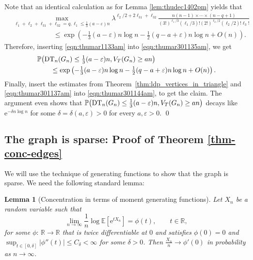 \documentclass[bj,authoryear,noshowframe]{imsart}
\numberwithin{equation}{section}
\theoremstyle{plain}
\newtheorem{lem}[thm]{Lemma}
\theoremstyle{definition}
\newcommand{\vep}{\varepsilon}
\newcommand{\e}{{\mathrm e}}
\newcommand{\DT}{{\rm DT}}
\begin{document}
Note that an identical calculation as for Lemma \ref{lem:thudec1402pm} yields that 
	\begin{equation}
	\label{eqn:thumar1133am}
	\begin{aligned}
	&\max_{\ell_1+\ell_2+\ell_{31}+\ell_{32}=q, \ell_1 \leq \tfrac13(a-\varepsilon)n} 
	{\lambda}^{\ell_2/2 +2\ell_{31}+\ell_{32}}\frac{n(n-1) \times\cdots\times (n-q +1)} {(3!)^{\ell_1/3}
	(\ell_1/3)!(2!)^{{\ell_2/2}}(\ell_2/2)!\ell_3!} \\
	&\qquad\qquad\qquad \leq \exp\left(-\tfrac13(a-\varepsilon)n \log{n} -\tfrac12(q-a+\varepsilon)n\log{n} +O(n)\right).	
	\end{aligned}
	\end{equation}
Therefore, inserting \eqref{eqn:thumar1133am} into \eqref{eqn:thumar301135am}, we get
	\begin{equation}
	\label{eqn:thumar301137am}
	\begin{aligned}
	&\mathbb{P}\big(\DT_n(G_n)\leq\tfrac13(a-\varepsilon)n,V_{T}(G_n) \geq an\big) \\
	&\qquad \leq \exp\left(-\tfrac13(a-\varepsilon)n\log{n} -\tfrac12(q-a+\varepsilon)n\log{n} +O(n)\right).
	\end{aligned}
	\end{equation}
Finally, insert the estimates from Theorem~\ref{thm:ldp_vertices_in_triangle} and \eqref{eqn:thumar301137am} into \eqref{eqn:thumar301144am}, to get the claim. The argument even shows that $\mathbb{P}\big(\DT_n(G_n)\leq\tfrac13(a-\varepsilon)n,V_{T}(G_n) \geq an\big)$ decays like $\e^{-\delta n\log{n}}$ for some $\delta=\delta(a,\varepsilon)>0$ for every $a,\vep>0$.
\qed


\subsection{The graph is sparse: Proof of Theorem \ref{thm-conc-edges}}
\label{sec:sparse}

We will use the technique of generating functions to show that the graph is sparse. We need the following standard lemma:

\begin{lem}[Concentration in terms of moment generating functions]
\label{lemma:tuedec20434pm}
Let $X_n$ be a random variable such that
	\begin{equation}
	\label{eqn:tuedec20456pm}
	\lim_{n\rightarrow \infty}\frac{1}{n}\log \mathbb{E}\left[\e^{tX_n}\right] = \phi(t),
	\qquad t \in \mathbb{R},
	\end{equation}
for some $\phi\colon\,\mathbb{R}\rightarrow \mathbb{R}$ that is twice differentiable at $0$ and satisfies $\phi(0)=0$ and $\sup_{t \in [0,\delta]}|\phi''(t)|\leq C_{\delta}<\infty$ for some $\delta>0$. Then $\frac{X_n}{n}\rightarrow \phi'(0)$ in probability as $n\to\infty$.
\end{lem}
\end{document}
